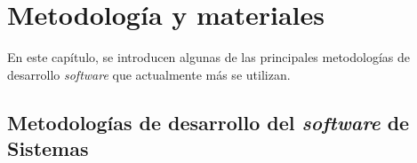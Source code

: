 \chapter{Metodología y materiales}
\label{chapter:metodologia}


En este capítulo, se introducen algunas de las principales metodologías de desarrollo \textit{software} que actualmente más se utilizan.

\section{Metodologías de desarrollo del \textit{software} de Sistemas}


%            

